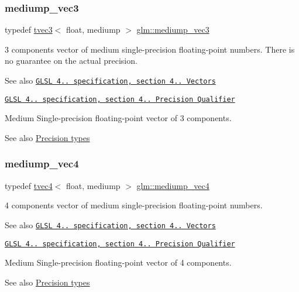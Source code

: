 \subsubsection{\texorpdfstring{mediump\+\_\+vec3}{mediump\_vec3}}
{\footnotesize\ttfamily typedef \hyperlink{structglm_1_1tvec3}{tvec3}$<$ float, mediump $>$ \hyperlink{group__core__precision_gac76bf24aca62ca13269d262121d04ceb}{glm\+::mediump\+\_\+vec3}}

3 components vector of medium single-\/precision floating-\/point numbers. There is no guarantee on the actual precision.

\begin{DoxySeeAlso}{See also}
\href{http://www.opengl.org/registry/doc/GLSLangSpec.4.20.8.pdf}{\tt G\+L\+SL 4.. specification, section 4.. Vectors} 

\href{http://www.opengl.org/registry/doc/GLSLangSpec.4.20.8.pdf}{\tt G\+L\+SL 4.. specification, section 4.. Precision Qualifier}
\end{DoxySeeAlso}
Medium Single-\/precision floating-\/point vector of 3 components. \begin{DoxySeeAlso}{See also}
\hyperlink{group__core__precision}{Precision types} 
\end{DoxySeeAlso}
\mbox{\label{group__core__precision_ga3e0bdf70b43f0c2863ad9f0fe7da9476}} 
\subsubsection{\texorpdfstring{mediump\+\_\+vec4}{mediump\_vec4}}
{\footnotesize\ttfamily typedef \hyperlink{structglm_1_1tvec4}{tvec4}$<$ float, mediump $>$ \hyperlink{group__core__precision_ga3e0bdf70b43f0c2863ad9f0fe7da9476}{glm\+::mediump\+\_\+vec4}}

4 components vector of medium single-\/precision floating-\/point numbers.

\begin{DoxySeeAlso}{See also}
\href{http://www.opengl.org/registry/doc/GLSLangSpec.4.20.8.pdf}{\tt G\+L\+SL 4.. specification, section 4.. Vectors} 

\href{http://www.opengl.org/registry/doc/GLSLangSpec.4.20.8.pdf}{\tt G\+L\+SL 4.. specification, section 4.. Precision Qualifier}
\end{DoxySeeAlso}
Medium Single-\/precision floating-\/point vector of 4 components. \begin{DoxySeeAlso}{See also}
\hyperlink{group__core__precision}{Precision types} 
\end{DoxySeeAlso}
\mbox{\label{group__core__precision_ga4fd29415871152bfb5abd588334147c8}} 
